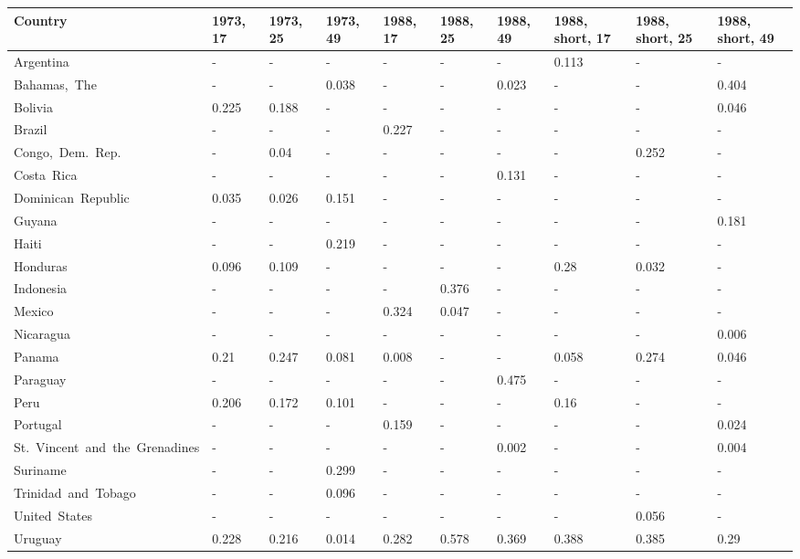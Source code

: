 \begin{table}[ht]
\centering
\begin{tabular}{llllllllll}
  \hline
Country & 1973, 17 & 1973, 25 & 1973, 49 & 1988, 17 & 1988, 25 & 1988, 49 & 1988, short, 17 & 1988, short, 25 & 1988, short, 49 \\ 
  \hline
Argentina & - & - & - & - & - & - & 0.113 & - & - \\ 
  Bahamas, The & - & - & 0.038 & - & - & 0.023 & - & - & 0.404 \\ 
  Bolivia & 0.225 & 0.188 & - & - & - & - & - & - & 0.046 \\ 
  Brazil & - & - & - & 0.227 & - & - & - & - & - \\ 
  Congo, Dem. Rep. & - & 0.04 & - & - & - & - & - & 0.252 & - \\ 
  Costa Rica & - & - & - & - & - & 0.131 & - & - & - \\ 
  Dominican Republic & 0.035 & 0.026 & 0.151 & - & - & - & - & - & - \\ 
  Guyana & - & - & - & - & - & - & - & - & 0.181 \\ 
  Haiti & - & - & 0.219 & - & - & - & - & - & - \\ 
  Honduras & 0.096 & 0.109 & - & - & - & - & 0.28 & 0.032 & - \\ 
  Indonesia & - & - & - & - & 0.376 & - & - & - & - \\ 
  Mexico & - & - & - & 0.324 & 0.047 & - & - & - & - \\ 
  Nicaragua & - & - & - & - & - & - & - & - & 0.006 \\ 
  Panama & 0.21 & 0.247 & 0.081 & 0.008 & - & - & 0.058 & 0.274 & 0.046 \\ 
  Paraguay & - & - & - & - & - & 0.475 & - & - & - \\ 
  Peru & 0.206 & 0.172 & 0.101 & - & - & - & 0.16 & - & - \\ 
  Portugal & - & - & - & 0.159 & - & - & - & - & 0.024 \\ 
  St. Vincent and the Grenadines & - & - & - & - & - & 0.002 & - & - & 0.004 \\ 
  Suriname & - & - & 0.299 & - & - & - & - & - & - \\ 
  Trinidad and Tobago & - & - & 0.096 & - & - & - & - & - & - \\ 
  United States & - & - & - & - & - & - & - & 0.056 & - \\ 
  Uruguay & 0.228 & 0.216 & 0.014 & 0.282 & 0.578 & 0.369 & 0.388 & 0.385 & 0.29 \\ 
   \hline
\end{tabular}
\end{table}
